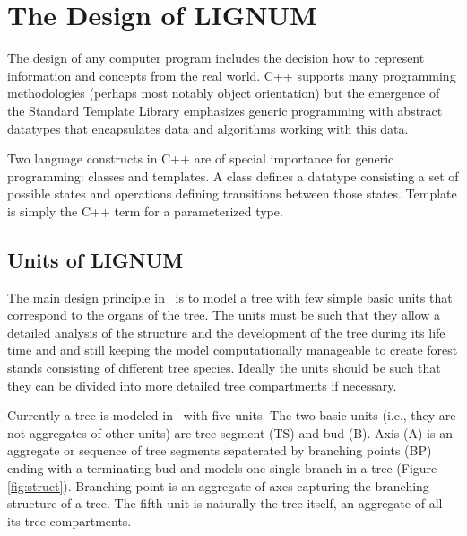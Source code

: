 \section{The Design of LIGNUM}

The  design of  any  computer  program includes  the  decision how  to
represent information  and concepts from the real  world. C++ supports
many   programming   methodologies   (perhaps  most   notably   object
orientation)  but  the  emergence  of the  Standard  Template  Library
emphasizes   generic   programming   with  abstract   datatypes   that
encapsulates data and algorithms  working with this data. 

Two language  constructs in C++ are  of special importance for generic
programming: classes  and   templates.   A class  defines   a datatype
consisting   a  set of   possible   states  and  operations   defining
transitions between those states. Template  is simply the C++ term for
a parameterized type.

\subsection{Units of LIGNUM} 

The main design  principle in  \lignum\ is to   model a tree with  few
simple  basic units  that correspond to   the organs of  the tree. The
units must  be   such that  they allow   a  detailed analysis  of  the
structure and the development of the tree during its life time and and
still keeping  the  model computationally manageable to  create forest
stands consisting of different tree species.  Ideally the units should
be such that they can be divided  into more detailed tree compartments
if necessary.

Currently  a tree is  modeled in  \lignum\ with  five units.   The two
basic units  (i.e., they are not  aggregates of other  units) are tree
segment (TS)  and bud (B).   Axis (A) is  an aggregate or  sequence of
tree  segments sepaterated  by  branching points  (BP)  ending with  a
terminating  bud  and models  one  single  branch  in a  tree  (Figure
\ref{fig:struct}). Branching  point is an aggregate  of axes capturing
the branching  structure of a tree.   The fifth unit  is naturally the
tree itself, an aggregate of all its tree compartments.

